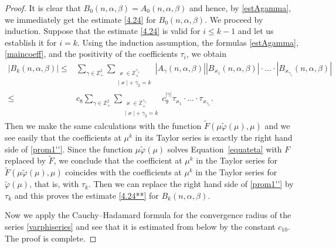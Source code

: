 \documentclass[10pt, a4paper]{article}
\theoremstyle{plain}
\theoremstyle{definition}
\numberwithin{equation}{section}
\def\a{\alpha}
\def\b{\beta}
\begin{document}
\begin{proof}
It is clear that $B_0(n,\a,\b)=A_0(n,\a,\b)$ and hence, by \eqref{estAgamma}, we immediately get
the estimate \eqref{4.24} for $B_0(n,\a,\b)$. We proceed by induction. Suppose that the estimate
\eqref{4.24} is valid for  $i\leqslant k-1$ and let us establish it for $i=k$. Using the induction assumption,
the formulas \eqref{estAgamma}, \eqref{maincoeff}, and the positivity of the coefficients $\tau_i$, we obtain
\begin{equation}\label{prom1''}
\begin{aligned}
|B_k(n,\a,\b)|\leqslant & \sum\limits_{\gamma\in\mathds{Z}_+^2}
\sum\limits_{\substack{\varkappa\in\mathds{Z}_+^{\gamma_1} \\ |\varkappa|+\gamma_2=k}}
|A_\gamma(n,\a,\b)||B_{\varkappa_1}(n,\a,\b)|\cdot\dots\cdot |B_{\varkappa_{\gamma_1}}(n,\a,\b)|
\\
\leqslant & c_{8}\sum\limits_{\gamma\in\mathds{Z}_+^2}
\sum\limits_{\substack{\varkappa\in\mathds{Z}_+^{\gamma_1} \\ |\varkappa|+\gamma_2=k}}
c_{9}^{|\gamma|}\tau_{\varkappa_1}\cdot\dots\cdot\tau_{\varkappa_{\gamma_1}}.
\end{aligned}
\end{equation}
Then we make the same calculations with the function
$\widetilde{F}(\mu\widetilde{\varphi}(\mu), \mu)$ and we see easily that the coefficients at $\mu^k$ in its Taylor series is exactly the right hand side of \eqref{prom1''}. Since the function $\mu\widetilde{\varphi}(\mu)$ solves Equation~\eqref{equateta}
with $F$ replaced by $\widetilde{F}$, we conclude that the coefficient at $\mu^k$ in the Taylor series for $\widetilde{F}(\mu\widetilde{\varphi}(\mu), \mu)$ coincides with the coefficients at $\mu^k$ in the Taylor series for $\widetilde{\varphi}(\mu)$, that is, with $\tau_k$. Then we can replace the right hand side of \eqref{prom1''} by $\tau_k$ and this proves the estimate \eqref{4.24**}
for $B_k(n, \alpha, \beta)$.

Now we apply the Cauchy--Hadamard formula for the convergence radius of the series \eqref{varphiseries} and see that it is estimated from below by the constant $c_{10}$. The proof is complete.
\end{proof}
\end{document}
